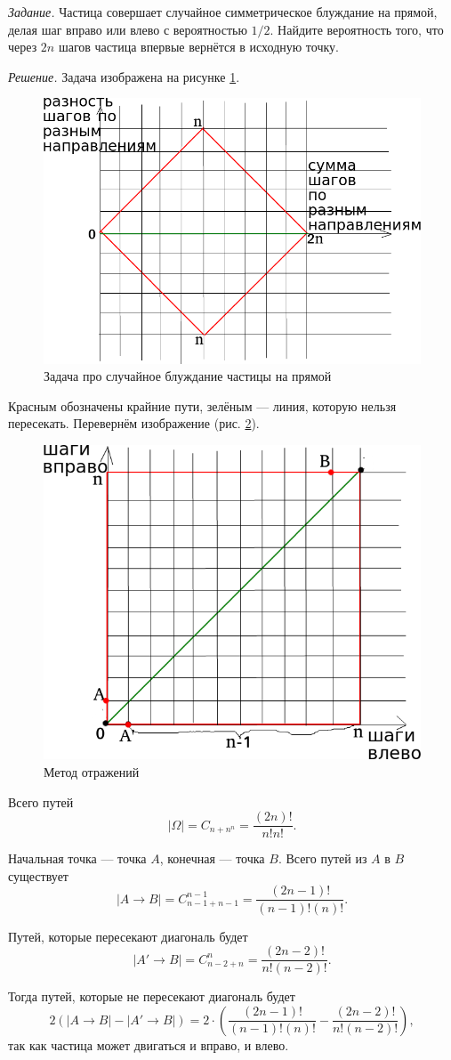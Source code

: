 \textit{Задание.} Частица совершает случайное симметрическое блуждание на прямой, делая шаг вправо или влево с вероятностью $1/2$.
Найдите вероятность того, что через $2n$ шагов частица впервые вернётся в исходную точку.

\textit{Решение.} Задача изображена на рисунке \ref{fig:34}.

\begin{figure}[h!]
  \centering
  \includegraphics[width=.4\textwidth]{./pictures/t1v3_4.png}
  \caption{Задача про случайное блуждание частицы на прямой}
  \label{fig:34}
\end{figure}

Красным обозначены крайние пути, зелёным --- линия, которую нельзя пересекать.
Перевернём изображение (рис. \ref{fig:341}).

\begin{figure}[h!]
  \centering
  \includegraphics[width=.4\textwidth]{./pictures/t1v3_41.png}
  \caption{Метод отражений}
  \label{fig:341}
\end{figure}

Всего путей
$$ \left| \Omega \right| =
C_{n+n^n} =
\frac{ \left( 2n \right)!}{n!n!}.$$

Начальная точка --- точка $A$, конечная --- точка $B$.
Всего путей из $A$ в $B$ существует
$$ \left| A \rightarrow B \right| =
C_{n-1+n-1}^{n-1} =
\frac{ \left( 2n-1 \right)!}{ \left( n-1 \right)! \left( n \right)!}.$$

Путей, которые пересекают диагональ будет
$$ \left| A' \rightarrow B \right| =
C_{n-2+n}^n =
\frac{ \left( 2n-2 \right)!}{n! \left( n-2 \right)!}.$$

Тогда путей, которые не пересекают диагональ будет
$$2 \left( \left| A \rightarrow B \right| - \left| A' \rightarrow B \right| \right) =
2 \cdot \left( \frac{ \left( 2n-1 \right)!}{ \left( n-1 \right)! \left( n \right)!} - \frac{ \left( 2n-2 \right)!}{n! \left( n-2 \right)!} \right),$$
так как частица может двигаться и вправо, и влево.

